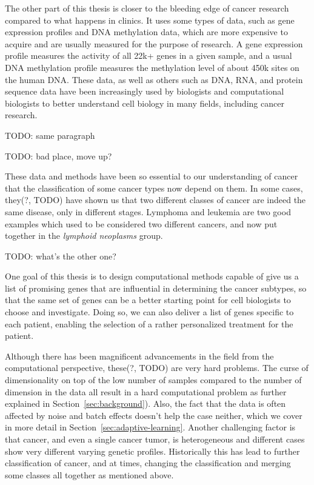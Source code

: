The other part of this thesis is closer to the bleeding edge of cancer research
compared to what happens in clinics. It uses some types of data, such as gene
expression profiles and DNA methylation data, which are more expensive to
acquire and are usually measured for the purpose of research. A gene expression
profile measures the activity of all 22k+ genes in a given sample, and a usual
DNA methylation profile measures the methylation level of about 450k sites on
the human DNA. These data, as well as others such as DNA, RNA, and protein
sequence data have been increasingly used by biologists and computational
biologists to better understand cell biology in many fields, including cancer
research.

TODO: same paragraph

TODO: bad place, move up?

These data and methods have been so essential to our understanding of cancer
that the classification of some cancer types now depend on them. In some cases,
they(?, TODO) have shown us that two different classes of cancer are indeed the same
disease, only in different stages. Lymphoma and leukemia are two good examples
which used to be considered two different cancers, and now put together in the
\emph{lymphoid neoplasms} group.

TODO: what's the other one?

One goal of this thesis is to design computational methods capable of give us a
list of promising genes that are influential in determining the cancer subtypes,
so that the same set of genes can be a better starting point for cell biologists
to choose and investigate. Doing so, we can also deliver a list of genes
specific to each patient, enabling the selection of a rather personalized
treatment for the patient.

Although there has been magnificent advancements in the field from the
computational perspective, these(?, TODO) are very hard problems. The curse of
dimensionality on top of the low number of samples compared to the number of
dimension in the data all result in a hard computational problem as further
explained in Section~\ref{sec:background}). Also, the fact that the data is
often affected by noise and batch effects doesn't help the case neither, which
we cover in more detail in Section~\ref{sec:adaptive-learning}. Another
challenging factor is that cancer, and even a single cancer tumor, is
heterogeneous and different cases show very different varying genetic profiles.
Historically this has lead to further classification of cancer, and at times,
changing the classification and merging some classes all together as mentioned
above.


